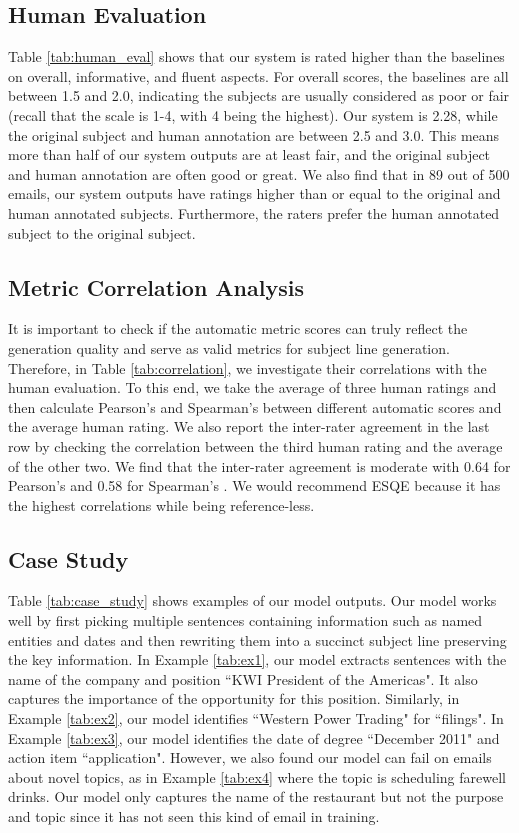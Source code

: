 \documentclass[11pt,a4paper]{article}
\newcommand{\esqe}{{\sc ESQE}\xspace}
\begin{document}
\subsection{Human Evaluation}
Table \ref{tab:human_eval} shows that our system is rated higher than the baselines on overall, informative, and fluent aspects.
For overall scores, the baselines are all between 1.5 and 2.0, indicating the subjects are usually considered as poor or fair  (recall that the scale is 1-4, with 4 being the highest).
Our system is 2.28, while the original subject and human annotation are between 2.5 and 3.0.
This means more than half of our system outputs are at least fair, and the original subject and human annotation are often good or great.
We also find that in 89 out of 500 emails, our system outputs have ratings higher than or equal to the original and human annotated subjects.  
Furthermore, the raters prefer the human annotated subject to the original subject.

\subsection{Metric Correlation Analysis}
It is important to check if the automatic metric scores can truly reflect the generation quality and serve as valid metrics for subject line generation.
Therefore, in Table \ref{tab:correlation}, we investigate their correlations with the human evaluation.
To this end, we take the average of three human ratings and then calculate Pearson's  and Spearman's  between different automatic scores and the average human rating.
We also report the inter-rater agreement in the last row by checking the correlation between the third human rating and the average of the other two.
We find that the inter-rater agreement is moderate with 0.64 for Pearson's  and 0.58 for Spearman's .
We would recommend \esqe because it has the highest correlations while being reference-less.

\subsection{Case Study}
\label{sec:case_study}
Table \ref{tab:case_study} shows examples of our model outputs.
Our model works well by first picking multiple sentences containing information such as named entities and dates and then rewriting them into a succinct subject line preserving the key information.
In Example \ref{tab:ex1}, our model extracts sentences with the name of the company and position ``KWI President of the Americas".
It also captures the importance of the opportunity for this position.
Similarly, in Example \ref{tab:ex2}, our model identifies ``Western Power Trading" for ``filings".
In Example \ref{tab:ex3}, our model identifies the date of degree ``December 2011" and action item ``application".
However, we also found our model can fail on emails about novel topics, as in Example \ref{tab:ex4} where the topic is scheduling farewell drinks.
Our model only captures the name of the restaurant but not the purpose and topic since it has not seen this kind of email in training.
\end{document}
